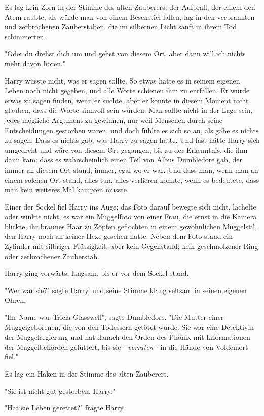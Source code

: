 {Es lag kein Zorn in der Stimme des alten Zauberers; der Aufprall, der einem den Atem raubte, als würde man von einem Besenstiel fallen, lag in den verbrannten und zerbrochenen Zauberstäben, die im silbernen Licht sanft in ihrem Tod schimmerten.

"Oder du drehst dich um und gehst von diesem Ort, aber dann will ich nichts mehr davon hören."

Harry wusste nicht, was er sagen sollte. So etwas hatte es in seinem eigenen Leben noch nicht gegeben, und alle Worte schienen ihm zu entfallen. Er würde etwas zu sagen finden, wenn er suchte, aber er konnte in diesem Moment nicht glauben, dass die Worte sinnvoll sein würden. Man sollte nicht in der Lage sein, jedes mögliche Argument zu gewinnen, nur weil Menschen durch seine Entscheidungen gestorben waren, und doch fühlte es sich so an, als gäbe es nichts zu sagen. Dass es nichts gab, was Harry zu sagen hatte. Und fast hätte Harry sich umgedreht und wäre von diesem Ort gegangen, bis zu der Erkenntnis, die ihm dann kam: dass es wahrscheinlich einen Teil von Albus Dumbledore gab, der immer an diesem Ort stand, immer, egal wo er war. Und dass man, wenn man an einem solchen Ort stand, alles tun, alles verlieren konnte, wenn es bedeutete, dass man kein weiteres Mal kämpfen musste.

Einer der Sockel fiel Harry ins Auge; das Foto darauf bewegte sich nicht, lächelte oder winkte nicht, es war ein Muggelfoto von einer Frau, die ernst in die Kamera blickte, ihr braunes Haar zu Zöpfen geflochten in einem gewöhnlichen Muggelstil, den Harry noch an keiner Hexe gesehen hatte. Neben dem Foto stand ein Zylinder mit silbriger Flüssigkeit, aber kein Gegenstand; kein geschmolzener Ring oder zerbrochener Zauberstab.

Harry ging vorwärts, langsam, bis er vor dem Sockel stand.

"Wer war sie?" sagte Harry, und seine Stimme klang seltsam in seinen eigenen Ohren.

"Ihr Name war Tricia Glasswell", sagte Dumbledore. "Die Mutter einer Muggelgeborenen, die von den Todessern getötet wurde. Sie war eine Detektivin der Muggelregierung und hat danach den Orden des Phönix mit Informationen der Muggelbehörden gefüttert, bis sie - \emph{verraten} - in die Hände von Voldemort fiel."

Es lag ein Haken in der Stimme des alten Zauberers.

"Sie ist nicht gut gestorben, Harry."

"Hat sie Leben gerettet?" fragte Harry.

}
